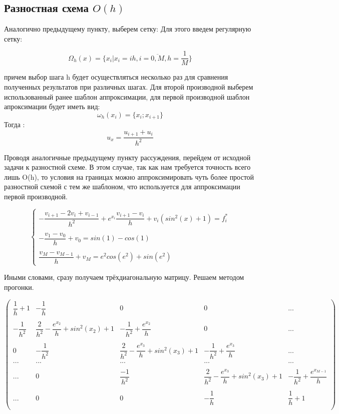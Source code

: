 \documentclass[12pt]{article}
\begin{document}
\subsection{Разностная схема $O(h)$}

Аналогично предыдущему пункту, выберем сетку:
Для этого введем регулярную сетку:

$$
\Omega_h(x) = \{x_i | x_i = ih, i = \overline{0, M}, h = \dfrac{1}{M}\}
$$

причем выбор шага h будет осуществляться несколько раз для сравнения полученных результатов при различных шагах.
Для второй производной выберем использованный ранее шаблон аппроксимации, для первой производной шаблон апроксимации будет иметь вид:
$$
\omega_h(x_i) = \{ x_{i}; x_{i + 1}\}
$$
Тогда :
$$
u_x = \dfrac{u_{i + 1} + u_{i}}{h^2}
$$

Проводя аналогичные предыдущему пункту рассуждения, перейдем от исходной задачи к разностной схеме. В этом случае, так как нам требуется точность всего лишь O(h), то условия на границах можно аппроксимировать чуть более простой разностной схемой с тем же шаблоном, что используется для аппроксимации первой производной.

$$
\begin{cases}
- \dfrac{v_{i+1} - 2v_i + v_{i - 1}}{h^2} + e^{x_i}\dfrac{v_{i+1} - v_i}{h} + v_i(sin^2(x) + 1) = f_i^* \\
\\
- \dfrac{v_1 - v_0}{h} + v_0 = sin(1) - cos(1) \\
\\
\dfrac{v_M - v_{M-1}}{h} + v_M = e^2cos(e^2) + sin(e^2)
\end{cases}
$$


Иными словами, сразу получаем трёхдиагональную матрицу. Решаем методом прогонки.

$$
\begin{pmatrix}
	\dfrac{1}{h} + 1& -\dfrac{1}{h} &  0 & 0 & ... \\
	\\
	-\dfrac{1}{h^2}  & \dfrac{2}{h^2} - \dfrac{e^{x_2}}{h} + sin^2(x_2) + 1 & -\dfrac{1}{h^2} + \dfrac{e^{x_2}}{h} & 0 & ... \\
	\\
	0 & -\dfrac{1}{h^2} & \dfrac{2}{h^2} - \dfrac{e^{x_3}}{h} + sin^2(x_3) + 1 &
	 -\dfrac{1}{h^2} + \dfrac{e^{x_3}}{h} & ... \\
	... & ... & ... & ... & ... \\
	\\
	... & 0 & \dfrac{-1}{h^2} & \dfrac{2}{h^2} - \dfrac{e^{x_3}}{h} + sin^2(x_3) + 1 &
	 -\dfrac{1}{h^2} + \dfrac{e^{x_{M-1}}}{h} \\
	\\
	... & 0 & 0 & -\dfrac{1}{h} & \dfrac{1}{h} + 1\\
\end{pmatrix}
$$
\end{document}
